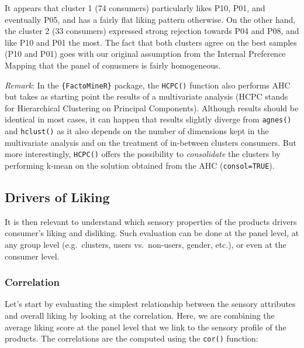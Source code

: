 \documentclass[
]{book}
\begin{document}
It appears that cluster 1 (74 consumers) particularly likes P10, P01, and eventually P05, and has a fairly flat liking pattern otherwise. On the other hand, the cluster 2 (33 consumers) expressed strong rejection towards P04 and P08, and like P10 and P01 the most.
The fact that both clusters agree on the best samples (P10 and P01) goes with our original assumption from the Internal Preference Mapping that the panel of conusmers is fairly homogeneous.

\emph{Remark}: In the \texttt{\{FactoMineR\}} package, the \texttt{HCPC()} function also performs AHC but takes as starting point the results of a multivariate analysis (HCPC stands for Hierarchical Clustering on Principal Components). Although results should be identical in most cases, it can happen that results slightly diverge from \texttt{agnes()} and \texttt{hclust()} as it also depends on the number of dimensions kept in the multivariate analysis and on the treatment of in-between clusters consumers. But more interestingly, \texttt{HCPC()} offers the possibility to \emph{consolidate} the clusters by performing k-mean on the solution obtained from the AHC (\texttt{consol=TRUE}).

\hypertarget{drivers-of-liking}{%
\subsection{Drivers of Liking}\label{drivers-of-liking}}

It is then relevant to understand which sensory properties of the products drivers consumer's liking and disliking. Such evaluation can be done at the panel level, at any group level (e.g.~clusters, users vs.~non-users, gender, etc.), or even at the consumer level.

\hypertarget{correlation}{%
\subsubsection{Correlation}\label{correlation}}

Let's start by evaluating the simplest relationship between the sensory attributes and overall liking by looking at the correlation. Here, we are combining the average liking score at the panel level that we link to the sensory profile of the products. The correlations are the computed using the \texttt{cor()} function:
\end{document}
